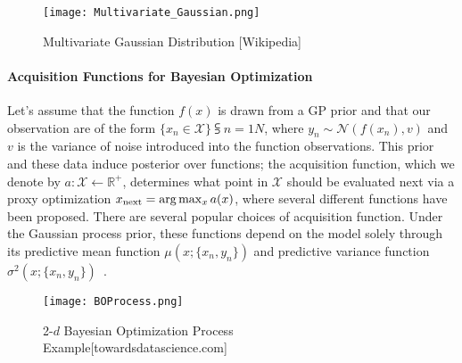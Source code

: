 \begin{figure} [h!]
	\centering
	\texttt{[image: Multivariate\_Gaussian.png]}
	\caption{Multivariate Gaussian Distribution [Wikipedia]}
	\label{fig:Multivatiate_Gaussian}
\end{figure}

\paragraph{Acquisition Functions for Bayesian Optimization} Let's assume that the function $f(x)$ is drawn from a GP prior and that our observation are of the form $\{x_n \in \mathcal{X}\}\subsup{}{ n=1}{N}$, where $y_n \sim \mathcal{N}(f(x_n), v)$ and $v$ is the variance of noise introduced into the function observations. This prior and these data induce  posterior over functions; the acquisition function, which we denote by $a : \mathcal{X} \leftarrow \mathbb{R}^+$, determines what point in $\mathcal{X}$ should be evaluated next via a proxy optimization $x\textsubscript{next} = \arg\max_{x}a(x)$, where several different functions have been proposed. There are several popular choices of acquisition function. Under the Gaussian process prior, these functions depend on the model solely through its predictive mean function $\mu(x; \{x_n, y_n\})$ and predictive variance function $\sigma^2(x; \{x_n, y_n\})$~\cite{NIPS2012_4522}.

\begin{figure} [h!]
	\centering
	\texttt{[image: BOProcess.png]}
	\caption{2-$d$ Bayesian Optimization Process Example[towardsdatascience.com]}
	\label{fig:BoProcess}
\end{figure}